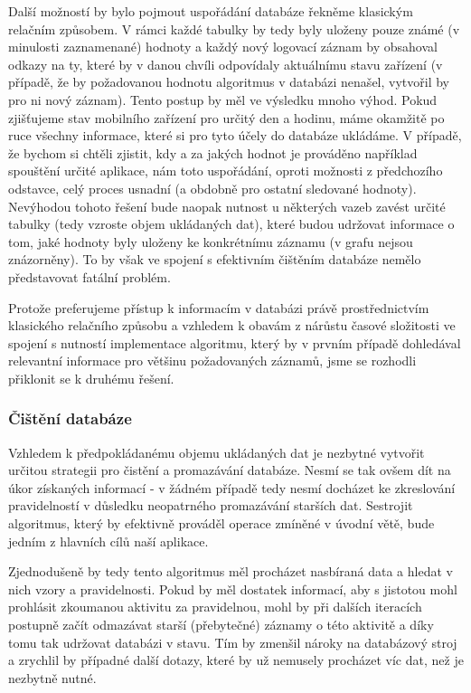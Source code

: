 \documentclass[thesis=M,czech]{FITthesis}[2012/06/26]
\begin{document}
Další možností by bylo pojmout uspořádání databáze řekněme klasickým relačním způsobem. V rámci každé tabulky by tedy byly uloženy pouze známé (v minulosti zaznamenané) hodnoty a každý nový logovací záznam by obsahoval odkazy na ty, které by v danou chvíli odpovídaly aktuálnímu stavu zařízení (v případě, že by požadovanou hodnotu algoritmus v databázi nenašel, vytvořil by pro ni nový záznam). Tento postup by měl ve výsledku mnoho výhod. Pokud zjišťujeme stav mobilního zařízení pro určitý den a hodinu, máme okamžitě po ruce všechny informace, které si pro tyto účely do databáze ukládáme. V případě, že bychom si chtěli zjistit, kdy a za jakých hodnot je prováděno například spouštění určité aplikace, nám toto uspořádání, oproti možnosti z předchozího odstavce, celý proces usnadní (a obdobně pro ostatní sledované hodnoty). Nevýhodou tohoto řešení bude naopak nutnost u některých vazeb zavést určité  tabulky (tedy vzroste objem ukládaných dat), které budou udržovat informace o tom, jaké hodnoty byly uloženy ke konkrétnímu záznamu (v grafu nejsou znázorněny). To by však ve spojení s efektivním čištěním databáze nemělo představovat fatální problém.

Protože preferujeme přístup k informacím v databázi právě prostřednictvím klasického relačního způsobu a vzhledem k obavám z nárůstu časové složitosti ve spojení s nutností implementace algoritmu, který by v prvním případě dohledával relevantní informace pro většinu požadovaných záznamů, jsme se rozhodli přiklonit se k druhému řešení.

\subsubsection*{Čištění databáze}
Vzhledem k předpokládanému objemu ukládaných dat je nezbytné vytvořit určitou strategii pro čistění a promazávání databáze. Nesmí se tak ovšem dít na úkor získaných informací - v žádném případě tedy nesmí docházet ke zkreslování pravidelností v důsledku neopatrného promazávání starších dat. Sestrojit algoritmus, který by efektivně prováděl operace zmíněné v úvodní větě, bude jedním z hlavních cílů naší aplikace.

Zjednodušeně by tedy tento algoritmus měl procházet nasbíraná data a hledat v nich vzory a pravidelnosti. Pokud by měl dostatek informací, aby s jistotou mohl prohlásit zkoumanou aktivitu za pravidelnou, mohl by při dalších iteracích postupně začít odmazávat starší (přebytečné) záznamy o této aktivitě a díky tomu tak udržovat databázi v  stavu. Tím by zmenšil nároky na databázový stroj a zrychlil by případné další dotazy, které by už nemusely procházet víc dat, než je nezbytně nutné.
\end{document}
